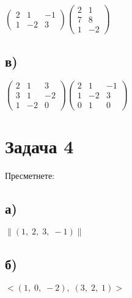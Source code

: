 \documentclass[12pt]{article}
\begin{document}
$\begin{pmatrix}
    2 & 1 & -1 \\
    1 & -2 & 3
\end{pmatrix}\begin{pmatrix}
    2 & 1 \\
    7 & 8 \\
    1 & -2
\end{pmatrix}$

\subsection*{в)}

$\begin{pmatrix}
    2 & 1 & 3\\
    3 & 1 & -2\\
    1 & -2 & 0
\end{pmatrix} \begin{pmatrix}
    2 & 1 & -1 \\
    1 & -2 & 3 \\
    0 & 1 & 0
\end{pmatrix}$

\section*{Задача 4}

Пресметнете:

\subsection*{а)}

$\|(1, \; 2, \; 3, \; -1)\|$

\subsection*{б)}

$<(1, \; 0, \; -2), \; (3, \; 2, \; 1)>$
\end{document}
